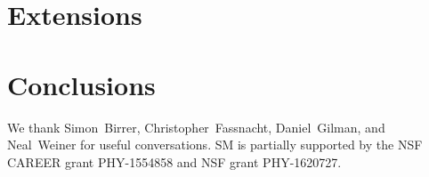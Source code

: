 \documentclass[twocolumn]{aastex62}
\begin{document}


\section{Extensions}
\label{sec:extensions}

\section{Conclusions}
\label{sec:conclusions}

\acknowledgements
We thank Simon~Birrer, Christopher~Fassnacht, Daniel~Gilman, and Neal~Weiner for useful conversations. SM is partially supported by the NSF CAREER grant PHY-1554858 and NSF grant PHY-1620727.




\end{document}
